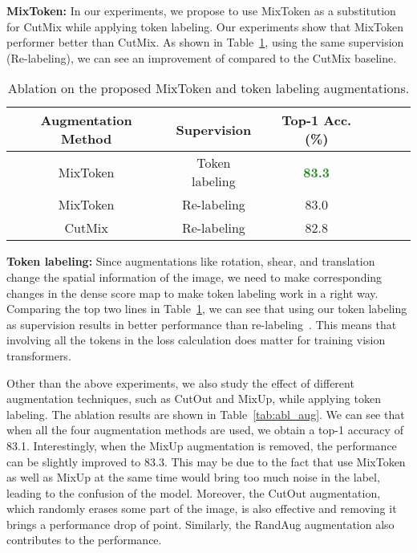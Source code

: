 \documentclass[10pt,twocolumn,letterpaper]{article}
\newcommand{\highlight}[1]{\textcolor{ForestGreen}{\textbf{#1}}}
\newcommand{\myPara}[1]{\vspace{.05in}\noindent\textbf{#1:}}
\begin{document}
\myPara{MixToken}
In our experiments, we propose to use MixToken as a substitution for CutMix 
while applying token labeling. 
Our experiments show that MixToken performer better than CutMix.
As shown in Table~\ref{tab:abl_mixtoken}, using the same supervision (Re-labeling),
we can see an improvement of  compared to the CutMix baseline. 


\begin{table}[H]
  \centering
  \small
  \setlength\tabcolsep{2.5mm}
  \renewcommand\arraystretch{1}
  \caption{Ablation on the proposed MixToken and token labeling augmentations.}
  
  \label{tab:abl_mixtoken}
  \begin{tabular}{cccccc} \toprule[0.5pt]
    Augmentation Method & Supervision &Top-1 Acc. (\%) \\ \midrule[0.5pt] \midrule[0.5pt]
     MixToken & Token labeling & \highlight{83.3} \\
     MixToken & Re-labeling & 83.0\\
     CutMix & Re-labeling & 82.8\\

    \bottomrule[0.5pt]
  \end{tabular}
\end{table}


\myPara{Token labeling}
Since augmentations like rotation, shear, and translation change the spatial information of the image, 
we need to make corresponding changes in the dense score map to make token labeling work in a right way.
Comparing the top two lines in Table~\ref{tab:abl_mixtoken}, we can see that using our token labeling as
supervision results in better performance than re-labeling~\cite{yun2021relabel}.
This means that involving all the tokens in the loss calculation does matter for training vision
transformers.

Other than the above experiments, we also study the effect of different augmentation techniques,
such as CutOut and MixUp, while applying token labeling.
The ablation results are shown in Table~\ref{tab:abl_aug}.
We can see that when all the four augmentation methods are used, we obtain a top-1 accuracy of 
83.1.
Interestingly, when the MixUp augmentation is removed, the performance can be slightly improved to 83.3.
This may be due to the fact that use MixToken as well as MixUp at the same time would bring 
too much noise in the label, leading to the confusion of the model.
Moreover, the CutOut augmentation, which randomly erases some part of the image, is also effective 
and removing it brings a performance drop of  point.
Similarly, the RandAug augmentation also contributes to the performance.
\end{document}
